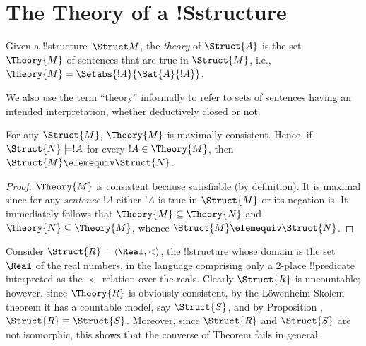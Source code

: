 \documentclass[../../include/open-logic-section]{subfiles}
\begin{document}
\section{The Theory of a !S{structure}}

\begin{defn} 
  Given a !!{structure}~$\Struct M$, the \emph{theory} of
  $\Struct{A}$ is the set $\Theory{M}$ of sentences
  that are true in $\Struct{M}$, i.e., $\Theory{M} =
  \Setabs{!A}{\Sat{A}{!A}}$.
\end{defn}

We also use the term ``theory'' informally to refer to sets
of sentences having an intended interpretation, whether deductively
closed or not.

\begin{prop}
  For any $\Struct{M}$,  $\Theory{M}$ is maximally
  consistent. Hence, if $\Struct{N} \models !A$ for every $!A
  \in \Theory{M}$, then $\Struct{M} \elemequiv
  \Struct{N}$. 
\end{prop}

\begin{proof}
  $\Theory{M}$ is consistent because satisfiable (by definition). It
  is maximal since for any \emph{sentence} $!A$ either $!A$ is true in
  $\Struct{M}$ or its negation is. It immediately follows that
  $\Theory{M} \subseteq \Theory{N}$ and $\Theory{N} \subseteq
  \Theory{M}$, whence $\Struct{M} \elemequiv \Struct{N}$.
\end{proof}

\begin{rem}
  Consider $\Struct{R} = \langle\Real, <\rangle$, the !!{structure}
  whose domain is the set $\Real$ of the real numbers, in the language
  comprising only a 2-place !!{predicate} interpreted as the $<$ relation
  over the reals. Clearly $\Struct{R}$ is uncountable; however, since
  $\Theory{R}$ is obviously consistent, by the L\"owenheim-Skolem
  theorem it has a countable model, say $\Struct{S}$, and by
  Proposition , $\Struct{R} \equiv
  \Struct{S}$. Moreover, since $\Struct{R}$ and $\Struct{S}$ are not
  isomorphic, this shows that the converse of Theorem 
  fails in general.
\end{rem}
\end{document}
